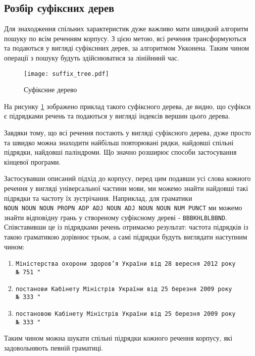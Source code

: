 \newpage
\subsection{Розбір суфіксних дерев}
Для знаходження спільних характеристик дуже важливо мати
швидкий алгоритм пошуку по всім реченням корпусу. З цією метою,
всі речення трансформуються та подаються у вигляді суфікснних дерев, за 
алгоритмом Укконена. Таким чином операції з пошуку будуть здійснюватися за лінійнинй час.

\begin{figure}[ht]
  \begin{center}
    \texttt{[image: suffix\_tree.pdf]}
  \end{center}
  \caption{Суфікснне дерево}
  \label{img:suffix_tree}
\end{figure}

На рисунку \ref{img:suffix_tree} зображено приклад такого суфіксного дерева,
де видно, що суфікси є підрядками речень та подаються у вигляді індексів
вершин цього дерева.

Завдяки тому, що всі речення постають у вигляді суфіксного дерева, дуже просто
та швидко можна знаходити найбільш повторювані рядки, найдовші спільні
підрядки, найдовші паліндроми. Що значно розширює способи застосування
кінцевої програми.

Застосувавши описаний підхід до корпусу, перед цим подавши усі слова кожного речення у вигляді універсальної частини мови, ми можемо знайти найдовші такі
підрядки та частоту їх зустрічання. Наприклад, для граматики
\texttt{NOUN~NOUN~NOUN~PROPN~ADP~ADJ~NOUN~ADJ~NOUN~NOUN~NUM~PUNCT} ми можемо
знайти відповідну грань у створеному суфіксному дереві - \texttt{BBBKHLBLBBND}.
Співставивши це із підрядками речень отримаємо результат: частота підрядків
із такою граматикою дорівнює трьом, а самі підрядки будуть виглядати наступним
чином: 
\begin{enumerate}
    \item \texttt{Міністерства охорони здоров’я України від 28 вересня 2012 року
    №~751~"}
    \item \texttt{постанови Кабінету Міністрів України від 25 березня 2009 року
    №~333~"}
    \item \texttt{постановою Кабінету Міністрів України від 25 березня 2009 року 
    №~333~"}
\end{enumerate}

Таким чином можна шукати спільні підрядки кожного речення корпусу, які
задовольняють певній граматиці. 


